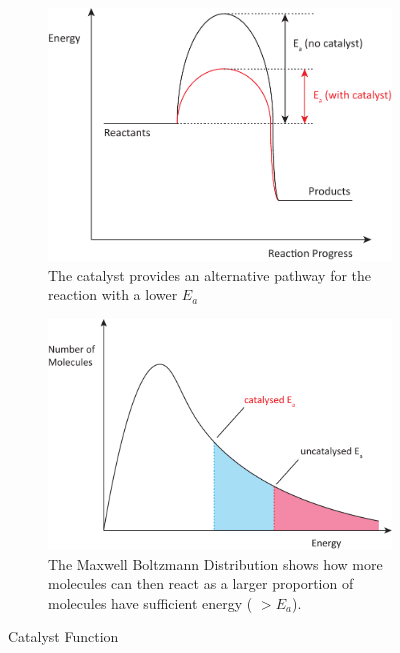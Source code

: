 \begin{figure}[h!]
     \centering
     \begin{subfigure}{0.45\textwidth}
         \centering
         \includegraphics[width=\textwidth]{fig/images/catalyst_enthalpy.pdf}
         \caption{The catalyst provides an alternative pathway for the reaction with a lower $E_a$}
         \label{fig:catalyst-enthalpy}
     \end{subfigure}
        \hfill
     \begin{subfigure}{0.45\textwidth}
         \centering
         \includegraphics[width=\textwidth]{fig/images/catalyst_maxwell.pdf}
         \caption{The Maxwell Boltzmann Distribution shows how more molecules can then react as a larger proportion of molecules have sufficient energy ( $ >E_a$).}
         \label{fig:catalyst-maxwell}
     \end{subfigure}
    \caption{Catalyst Function}
    \label{fig:background_1}
\end{figure}